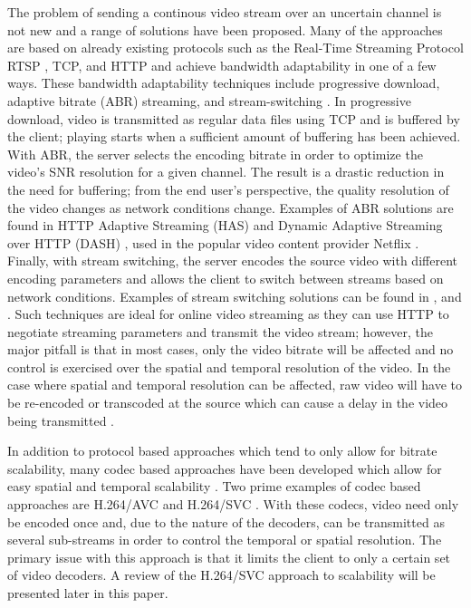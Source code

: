 The problem of sending a continous video stream over an uncertain channel is not new and a range of solutions have been proposed. Many of the approaches are based on already existing protocols such as the Real-Time Streaming Protocol RTSP \cite{RTSP}, TCP, and HTTP \cite{HASQoE, Apple, Microsoft, Netflix} and achieve bandwidth adaptability in one of a few ways. These bandwidth adaptability techniques include progressive download, adaptive bitrate (ABR) streaming, and stream-switching \cite{FeedbackControl}. In progressive download, video is transmitted as regular data files using TCP and is buffered by the client; playing starts when a sufficient amount of buffering has been achieved. With ABR, the server selects the encoding bitrate in order to optimize the video's SNR resolution for a given channel. The result is a drastic reduction in the need for buffering; from the end user's perspective, the quality resolution of the video changes as network conditions change. Examples of ABR solutions are found in HTTP Adaptive Streaming (HAS) \cite{HASQoE} and Dynamic Adaptive Streaming over HTTP (DASH) \cite{DASH}, used in the popular video content provider Netflix \cite{Netflix}. Finally, with stream switching, the server encodes the source video with different encoding parameters and allows the client to switch between streams based on network conditions. Examples of stream switching solutions can be found in \cite{FeedbackControl},\cite{Apple} and \cite{Microsoft}. Such techniques are ideal for online video streaming as they can use HTTP to negotiate streaming parameters and transmit the video stream; however, the major pitfall is that in most cases, only the video bitrate will be affected and no control is exercised over the spatial and temporal resolution of the video. In the case where spatial and temporal resolution can be affected, raw video will have to be re-encoded or transcoded at the source which can cause a delay in the video being transmitted \cite{FeedbackControl}.

In addition to protocol based approaches which tend to only allow for bitrate scalability, many codec based approaches have been developed which allow for easy spatial and temporal scalability \cite{SVCAdvances}. Two prime examples of codec based approaches are H.264/AVC and H.264/SVC \cite{SVCOverview}\cite{SVCTutorial}. With these codecs, video need only be encoded once and, due to the nature of the decoders, can be transmitted as several sub-streams in order to control the temporal or spatial resolution. The primary issue with this approach is that it limits the client to only a certain set of video decoders. A review of the H.264/SVC approach to scalability will be presented later in this paper.

